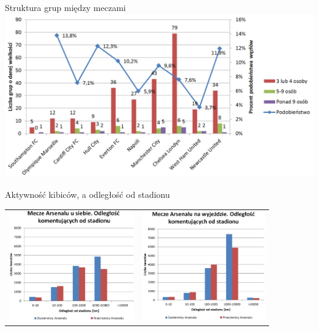 \documentclass{beamer}
\begin{document}
\begin{frame}{Struktura grup między meczami}
\includegraphics[width=1\textwidth]{img/grupy-arsenal-nums.png}
\end{frame}

\begin{frame}{Aktywność kibiców, a odległość od stadionu}
\begin{adjustwidth}{-5cm}{-5cm}
\begin{table}
\begin{tabular}{rl}
\includegraphics[width=5.4cm]{img/odleglosc-od-stadionu-home.png}
&
\includegraphics[width=5.3cm]{img/odleglosc-od-stadionu-away.png}
\end{tabular}
\end{table}
\end{adjustwidth}
\end{frame}
\end{document}
